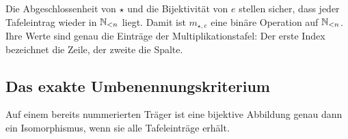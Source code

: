 \documentclass[main.tex]{subfiles}
\begin{document}
Die Abgeschlossenheit von \(\star\) und die Bijektivität von \(e\)
stellen sicher, dass jeder Tafeleintrag wieder in \(\mathbb{N}_{<n}\) liegt.
Damit ist \(m_{\star,e}\) eine binäre Operation auf
\(\mathbb{N}_{<n}\).  Ihre Werte sind genau die Einträge der
Multiplikationstafel: Der erste Index bezeichnet die Zeile, der zweite die
Spalte.

\subsection{Das exakte Umbenennungskriterium}

Auf einem bereits nummerierten Träger ist eine bijektive Abbildung genau
dann ein Isomorphismus, wenn sie alle Tafeleinträge erhält.

\end{document}

